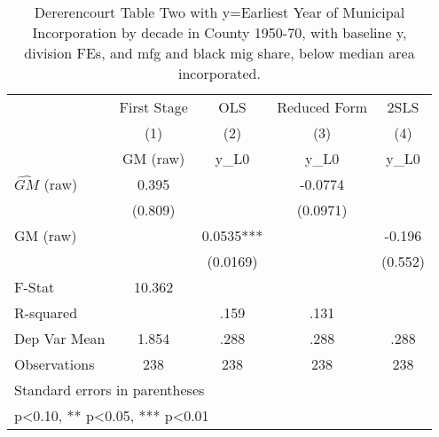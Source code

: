 \begin{table}[htbp]\centering
\def\sym#1{\ifmmode^{#1}\else\(^{#1}\)\fi}
\caption{Dererencourt Table Two with y=Earliest Year of Municipal Incorporation by decade in County 1950-70, with baseline y, division FEs, and mfg and black mig share, below median area incorporated.}
\begin{tabular}{l*{4}{c}}
\toprule
                    & First Stage   &         OLS   &Reduced Form   &        2SLS   \\
                    &\multicolumn{1}{c}{(1)}&\multicolumn{1}{c}{(2)}&\multicolumn{1}{c}{(3)}&\multicolumn{1}{c}{(4)}\\
                    &\multicolumn{1}{c}{GM  (raw)}&\multicolumn{1}{c}{y\_L0}&\multicolumn{1}{c}{y\_L0}&\multicolumn{1}{c}{y\_L0}\\
\midrule
$\hat{GM}$ (raw)    &       0.395   &               &     -0.0774   &               \\
                    &     (0.809)   &               &    (0.0971)   &               \\
\addlinespace
GM  (raw)           &               &      0.0535***&               &      -0.196   \\
                    &               &    (0.0169)   &               &     (0.552)   \\
\midrule
F-Stat              &      10.362   &               &               &               \\
R-squared           &               &        .159   &        .131   &               \\
Dep Var Mean        &       1.854   &        .288   &        .288   &        .288   \\
Observations        &         238   &         238   &         238   &         238   \\
\bottomrule
\multicolumn{5}{l}{\footnotesize Standard errors in parentheses}\\
\multicolumn{5}{l}{\footnotesize * p<0.10, ** p<0.05, *** p<0.01}\\
\end{tabular}
\end{table}
